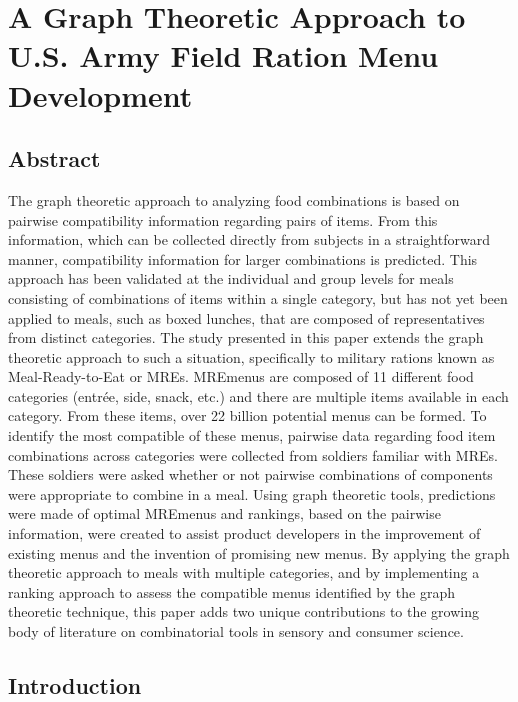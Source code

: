 \chapter{A Graph Theoretic Approach to U.S. Army Field Ration Menu Development}
\section{Abstract}
The graph theoretic approach to analyzing food combinations is based on pairwise compatibility information regarding pairs of items.  From this information, which can be collected directly from subjects in a straightforward manner, compatibility information for larger combinations is predicted.  This approach has been validated at the individual and group levels for meals consisting of combinations of items within a single category, but has not yet been applied to meals, such as boxed lunches, that are composed of representatives from distinct categories.  The study presented in this paper extends the graph theoretic approach to such a situation, specifically to military rations known as Meal-Ready-to-Eat or MREs\tm.  MRE\tm menus are composed of 11 different food categories (entrée, side, snack, etc.) and there are multiple items available in each category.  From these items, over 22 billion potential menus can be formed.  To identify the most compatible of these menus, pairwise data regarding food item combinations across categories were collected from soldiers familiar with MREs\tm.  These soldiers were asked whether or not pairwise combinations of components were appropriate to combine in a meal.  Using graph theoretic tools, predictions were made of optimal MRE\tm menus and rankings, based on the pairwise information, were created to assist product developers in the improvement of existing menus and the invention of promising new menus.  By applying the graph theoretic approach to meals with multiple categories, and by implementing a ranking approach to assess the compatible menus identified by the graph theoretic technique, this paper adds two unique contributions to the growing body of literature on combinatorial tools in sensory and consumer science.

\section{Introduction}

